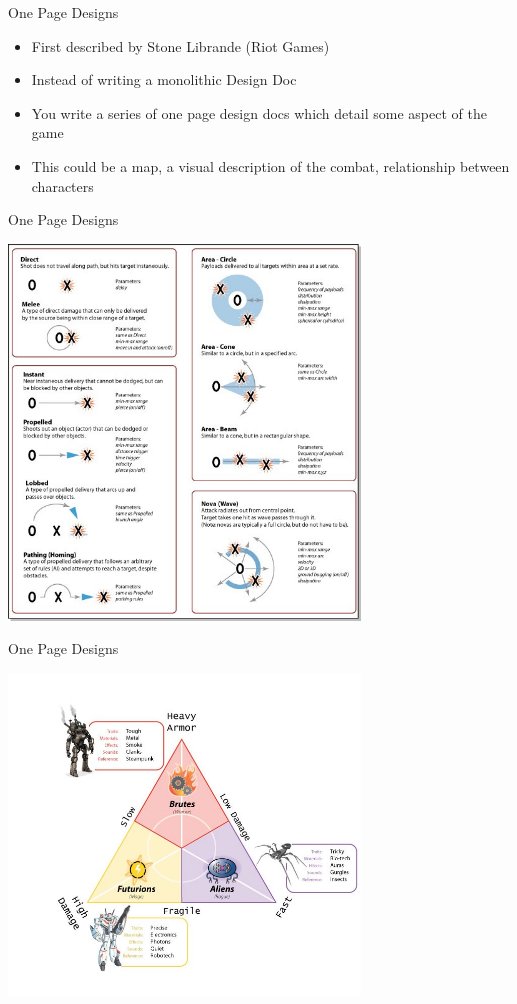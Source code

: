 \begin{frame}{One Page Designs}
	\begin{itemize}
		\item First described by Stone Librande (Riot Games) 
		\item Instead of writing a monolithic Design Doc
		\item You write a series of one page design docs which detail some aspect of the game
		\item This could be a map, a visual description of the combat, relationship between characters
	\end{itemize}
\end{frame}

\begin{frame}{One Page Designs}
	\begin{center}
		\includegraphics[width=0.7\textwidth,height=0.7\textheight]{combat_diagram}
	\end{center}
\end{frame}

\begin{frame}{One Page Designs}
	\begin{center}
		\includegraphics[width=0.7\textwidth,height=0.7\textheight]{unit_diagram}
	\end{center}
\end{frame}

